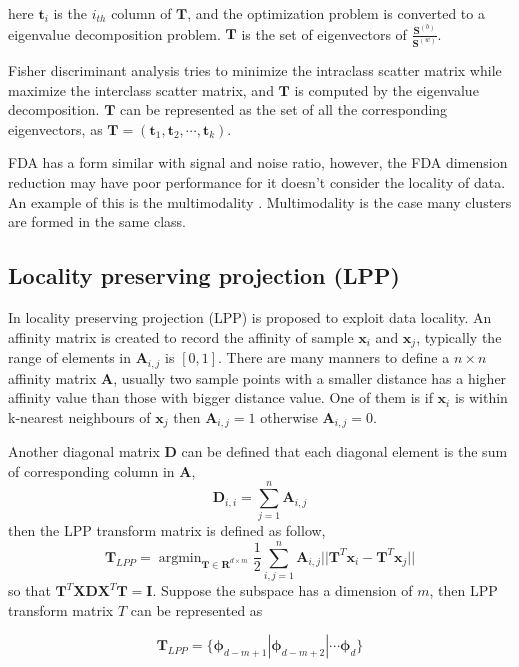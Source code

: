 here $\bm{t}_i$ is the $i_{th}$ column of $\bm{T}$, and the optimization problem is converted to a eigenvalue decomposition problem. $\bm{T}$ is the set of eigenvectors of $\frac{\bm{S}^{(b)}}{\bm{S}^{(w)}}$.

Fisher discriminant analysis tries to minimize the intraclass scatter matrix while maximize the interclass scatter matrix, and $\bm{T}$ is computed by the eigenvalue decomposition. $\bm{T}$ can be represented as the set of all the corresponding eigenvectors, as $ \bm{T} = (\bm{t}_1,\bm{t}_2,\cdots,\bm{t}_k)$.

FDA has a form similar with signal and noise ratio, however, the FDA dimension reduction may have poor performance for it doesn't consider the locality of data. An example of this is the multimodality \cite{KLFDA}. Multimodality is the case many clusters are formed in the same class. 
\subsection{Locality preserving projection (LPP)}

In \cite{LPP} locality preserving projection (LPP) is proposed to exploit data locality. An affinity matrix is created to record the affinity of sample $\bm{x}_i$ and $\bm{x}_j$,  typically the range of elements in $\bm{A}_{i,j}$ is $[0,1]$. There are many manners to define a $n \times n$ affinity matrix $\bm{A}$, usually two sample points with a smaller distance has a higher affinity value than those with bigger distance value. One of them is if  $\bm{x}_i$ is within k-nearest neighbours of $\bm{x}_j$ then $\bm{A}_{i,j} = 1$ otherwise  $\bm{A}_{i,j} = 0$.  

Another diagonal matrix $\bm{D}$ can be defined that each diagonal element is the sum of corresponding column in $\bm{A}$,
\begin{equation}
\bm{D}_{i,i} = \mathop{\sum}_{j=1}^n \bm{A}_{i, j} 
\end{equation}
then the LPP transform matrix is defined as follow,
\begin{equation}
\bm{T}_{LPP} = \mathop{\arg\min}_{\bm{T}\in\bm{R}^{d\times m}} \frac{1}{2}\mathop{\sum}_{i, j= 1}^n \bm{A}_{i,j} ||\bm{T}^T\bm{x}_i - \bm{T}^T\bm{x}_j||
\end{equation}
so that $ \bm{T}^T\bm{X}\bm{D}\bm{X}^T\bm{T} = \bm{I} $.
Suppose the subspace has a dimension of $m$, then LPP transform matrix $T$ can be represented as 

$$\bm{T}_{LPP} = \{ \bm{\phi}_{d-m+1} | \bm{\phi}_{d-m+2} | \cdots \bm{\phi}_{d}\} $$

